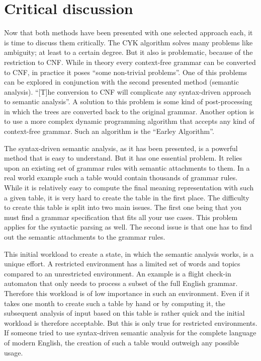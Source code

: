 \documentclass[12pt,twoside]{scrartcl}
\theoremstyle{plain}
\theoremstyle{definition}
\theoremstyle{remark}
\begin{document}
		
		
\section{Critical discussion}
\label{sec:critDiscussion}


	Now that both methods have been presented with one selected approach each, it is time to discuss them critically. The CYK algorithm solves many problems like ambiguity; at least to a certain degree. But it also is problematic, because of the restriction to CNF. While in theory every context-free grammar can be converted to CNF, in practice it poses ``some non-trivial problems''\cite[p.~475]{Jurafsky2009b}. One of this problems can be explored in conjunction with the second presented method (semantic analysis). ``[T]he conversion to CNF will complicate any syntax-driven approach to semantic analysis''\cite[p.~475]{Jurafsky2009b}. A solution to this problem is some kind of post-processing in which the trees are converted back to the original grammar.\cite{Jurafsky2009b} Another option is to use a more complex dynamic programming algorithm that accepts any kind of context-free grammar. Such an algorithm is the ``Earley Algorithm''\cite[p.~477]{Jurafsky2009b}.
	
	The syntax-driven semantic analysis, as it has been presented, is a powerful method that is easy to understand. But it has one essential problem. It relies upon an existing set of grammar rules with semantic attachments to them. In a real world example such a table would contain thousands of grammar rules.\cite{Russel2010} While it is relatively easy to compute the final meaning representation with such a given table, it is very hard to create the table in the first place. The difficulty to create this table is split into two main issues. The first one being that you must find a grammar specification that fits all your use cases. This problem applies for the syntactic parsing as well. The second issue is that one has to find out the semantic attachments to the grammar rules.
	
	This initial workload to create a state, in which the semantic analysis works, is a unique effort.\cite{Jurafsky2009} A restricted environment has a limited set of words and topics compared to an unrestricted environment. An example is a flight check-in automaton that only needs to process a subset of the full English grammar. Therefore this workload is of low importance in such an environment. Even if it takes one month to create such a table by hand or by computing it, the subsequent analysis of input based on this table is rather quick and the initial workload is therefore acceptable. But this is only true for restricted environments. If someone tried to use syntax-driven semantic analysis for the complete language of modern English, the creation of such a table would outweigh any possible usage.
	
\end{document}
